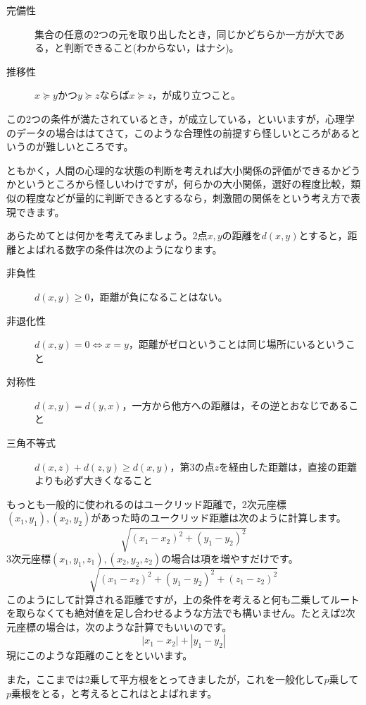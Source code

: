\documentclass{ltjsbook}
\begin{document}
\begin{description}
	\item[完備性]集合の任意の2つの元を取り出したとき，同じかどちらか一方が大である，と判断できること(わからない，はナシ)。
	\item[推移性] $x \succeq y$かつ$y \succeq z$ならば$x \succeq z$，が成り立つこと。
\end{description}

この2つの条件が満たされているとき，が成立している，といいますが，心理学のデータの場合ははてさて，このような合理性の前提すら怪しいところがあるというのが難しいところです。

ともかく，人間の心理的な状態の判断を考えれば大小関係の評価ができるかどうかというところから怪しいわけですが，何らかの大小関係，選好の程度比較，類似の程度などが量的に判断できるとするなら，刺激間の関係をという考え方で表現できます。

あらためてとは何かを考えてみましょう。2点$x,y$の距離を$d(x,y)$とすると，距離とよばれる数字の条件は次のようになります。
\begin{description}
	\item[非負性] $d(x,y)\ge 0$，距離が負になることはない。
	\item[非退化性] $d(x,y)=0 \Leftrightarrow x=y$，距離がゼロということは同じ場所にいるということ
	\item[対称性] $d(x,y)=d(y,x)$，一方から他方への距離は，その逆とおなじであること
	\item[三角不等式] $d(x,z) + d(z,y) \ge d(x,y)$，第3の点$z$を経由した距離は，直接の距離よりも必ず大きくなること
\end{description}

もっとも一般的に使われるのはユークリッド距離で，2次元座標$(x_1,y_1),(x_2,y_2)$があった時のユークリッド距離は次のように計算します。
\[ \sqrt{(x_1-x_2)^2+(y_1-y_2)^2} \]
3次元座標$(x_1,y_1,z_1),(x_2,y_2,z_2)$の場合は項を増やすだけです。
\[ \sqrt{(x_1-x_2)^2+(y_1-y_2)^2+(z_1-z_2)^2} \]
このようにして計算される距離ですが，上の条件を考えると何も二乗してルートを取らなくても絶対値を足し合わせるような方法でも構いません。たとえば2次元座標の場合は，次のような計算でもいいのです。
\[ |x_1-x_2|+|y_1-y_2| \]
現にこのような距離のことをといいます。

また，ここまでは2乗して平方根をとってきましたが，これを一般化して$p$乗して$p$乗根をとる，と考えるとこれはとよばれます。
\end{document}
